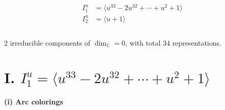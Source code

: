 \documentclass[1p]{elsarticle_modified}
\theoremstyle{definition}
\begin{document}
\begin{align*}
I^u_{1}&=\langle 
u^{33}-2 u^{32}+\cdots+u^2+1\rangle \\
I^u_{2}&=\langle 
u+1\rangle \\
\\
\end{align*}
\raggedright * 2 irreducible components of $\dim_{\mathbb{C}}=0$, with total 34 representations.\\
\newpage
\renewcommand{\arraystretch}{1}
\centering \section*{I. $I^u_{1}= \langle u^{33}-2 u^{32}+\cdots+u^2+1 \rangle$}
\flushleft \textbf{(i) Arc colorings}\\
\end{document}
